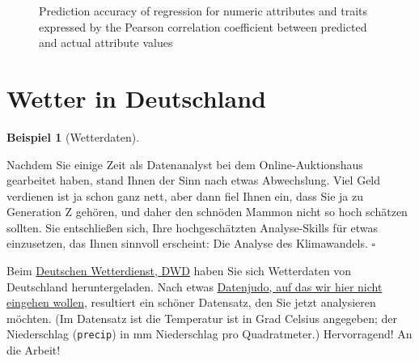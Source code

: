 \documentclass[
  letterpaper,
  twoside,
  open=any]{scrbook}
\theoremstyle{definition}
\theoremstyle{definition}
\theoremstyle{definition}
\newtheorem{example}{Beispiel}[chapter]
\theoremstyle{remark}
\begin{document}
\begin{figure}


\caption{\label{fig-pnas1}Prediction accuracy of regression for numeric
attributes and traits expressed by the Pearson correlation coefficient
between predicted and actual attribute values}

\end{figure}%

\section{Wetter in Deutschland}\label{wetter-in-deutschland}

\begin{example}[Wetterdaten]\protect\hypertarget{exm-wetterdaten}{}\label{exm-wetterdaten}

Nachdem Sie einige Zeit als Datenanalyst bei dem Online-Auktionshaus
gearbeitet haben, stand Ihnen der Sinn nach etwas Abwechslung. Viel Geld
verdienen ist ja schon ganz nett, aber dann fiel Ihnen ein, dass Sie ja
zu Generation Z gehören, und daher den schnöden Mammon nicht so hoch
schätzen sollten. Sie entschließen sich, Ihre hochgeschätzten
Analyse-Skills für etwas einzusetzen, das Ihnen sinnvoll erscheint: Die
Analyse des Klimawandels. \(\square\)

\end{example}

Beim \href{https://www.dwd.de/DE/Home/home_node.html}{Deutschen
Wetterdienst, DWD} haben Sie sich Wetterdaten von Deutschland
heruntergeladen. Nach etwas
\href{https://data-se.netlify.app/2022/07/24/preparing-german-weather-data/}{Datenjudo,
auf das wir hier nicht eingehen wollen,} resultiert ein schöner
Datensatz, den Sie jetzt analysieren möchten. (Im Datensatz ist die
Temperatur ist in Grad Celsius angegeben; der Niederschlag
(\texttt{precip}) in mm Niederschlag pro Quadratmeter.) Hervorragend! An
die Arbeit!
\end{document}
